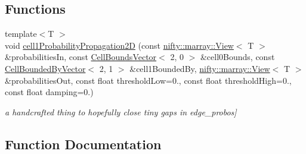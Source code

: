 \subsection*{Functions}
\begin{DoxyCompactItemize}
\item 
{\footnotesize template$<$T $>$ }\\void \hyperlink{namespacenifty_1_1cgp_a843b0dda23907002418edcd4765cdae1}{cell1\+Probability\+Propagation2D} (const \hyperlink{classandres_1_1View}{nifty\+::marray\+::\+View}$<$ T $>$ \&probabilities\+In, const \hyperlink{classnifty_1_1cgp_1_1CellBoundsVector}{Cell\+Bounds\+Vector}$<$ 2, 0 $>$ \&cell0\+Bounds, const \hyperlink{classnifty_1_1cgp_1_1CellBoundedByVector}{Cell\+Bounded\+By\+Vector}$<$ 2, 1 $>$ \&cell1\+Bounded\+By, \hyperlink{classandres_1_1View}{nifty\+::marray\+::\+View}$<$ T $>$ \&probabilities\+Out, const float threshold\+Low=0., const float threshold\+High=0., const float damping=0.)
\begin{DoxyCompactList}\small\item\em a handcrafted thing to hopefully close tiny gaps in edge\+\_\+probos\mbox{]} \end{DoxyCompactList}\end{DoxyCompactItemize}


\subsection{Function Documentation}
\mbox{\label{namespacenifty_1_1cgp_a843b0dda23907002418edcd4765cdae1}} 

